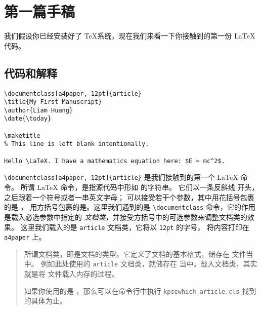 \chapter{第一篇手稿}
\label{chap:hello_world}

我们假设你已经安装好了 \TeX 系统，现在我们来看一下你接触到的第一份 \LaTeX{} 代码。

\section{代码和解释}

\begin{lstlisting}[style = lltx, caption = {Hello \LaTeX{}}, label = {lst:hello}]
\documentclass[a4paper, 12pt]{article}
\title{My First Manuscript}
\author{Liam Huang}
\date{\today}

\maketitle
% This line is left blank intentionally.

Hello \LaTeX. I have a mathematics equation here: $E = mc^2$.

\end{lstlisting}

\lstinline[style = iltx]|\documentclass[a4paper, 12pt]{article}|
是我们接触到的第一个 \LaTeX{} 命令。
所谓 \LaTeX{} 命令，是指源代码中形如
 的字符串。
它们以一条反斜线 \cs{} 开头，之后跟着一个符号或者一串英文字母；
可以接受若干个参数，其中用花括号包裹的是 ，
用方括号包裹的是。这里我们遇到的是
\lstinline[style = iltx]|\documentclass| 命令，它的作用是载入必选参数中指定的%
\emph{文档类}，并接受方括号中的可选参数来调整文档类的效果。
这里我们载入的是 \lstinline[style = iltx]|article| 文档类，它将以
\lstinline[style = iltx]|12pt| 的字号，
将内容打印在 \lstinline[style = iltx]|a4paper| 上。

\begin{quote}
  所谓文档类，即是文档的类型。它定义了文档的基本格式，储存在  文件当中。
  例如此处使用的 \lstinline[style = iltx]|article| 文档类，就储存在
   当中。载入文档类，其实就是将  文件载入内存的过程。

  如果你使用的是 \tl{}，那么可以在命令行中执行
  \lstinline[style = ibash]|kpsewhich article.cls|
  找到  的具体为止。
\end{quote}

